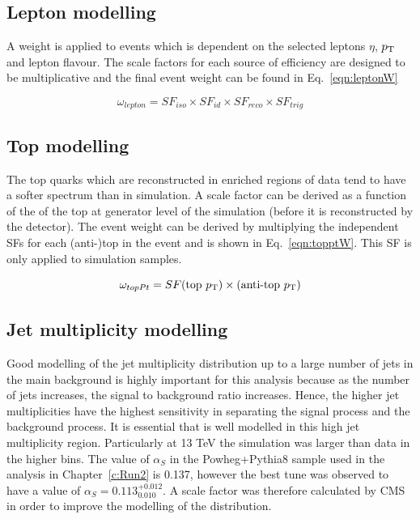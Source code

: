 \subsection{Lepton modelling}
A weight is applied to events which is dependent on the selected leptons $\eta$, $p_{\mathrm{T}}$ and lepton flavour. The scale factors for each source of efficiency are designed to be multiplicative and the final event weight can be found in Eq.~\ref{eqn:leptonW}

\begin{equation}
\omega_{lepton} = SF_{iso}\times SF_{id}\times SF_{reco}\times SF_{trig}
\label{eqn:leptonW}
\end{equation}

\subsection{Top \pt modelling}

The top quarks which are reconstructed in \ttbar enriched regions of data tend to have a softer \pt spectrum than in \ttbar simulation. A scale factor can be derived as a function of the \pt of the top at generator level of the simulation (before it is reconstructed by the detector). The event weight can be derived by multiplying the independent SFs for each (anti-)top in the event and is shown in Eq.~\ref{eqn:topptW}. This SF is only applied to \ttbar simulation samples.

\begin{equation}
\omega_{topPt} = SF(\textrm{top}~p_{\mathrm{T}})\times (\textrm{anti-top}~p_{\mathrm{T}})
\label{eqn:topptW}
\end{equation}

\subsection{Jet multiplicity modelling \label{subsec:alphaS}}
Good modelling of the jet multiplicity distribution up to a large number of jets in the main \ttbar background is highly important for this analysis because as the number of jets increases, the signal to background ratio increases. Hence, the higher jet multiplicities have the highest sensitivity in separating the signal \tttt process and the background \ttbar process. It is essential that \ttbar is well modelled in this high jet multiplicity region. 
Particularly at 13 TeV the simulation was larger than data in the higher \njets bins. The value of $\alpha_S$ in the \ttbar Powheg+Pythia8 sample used in the analysis in Chapter~\ref{c:Run2} is 0.137, however the best tune was observed to have a value of $\alpha_S=0.113^{+0.012}_{0.010}$. A scale factor was therefore calculated by CMS in order to improve the modelling of the \njets distribution. 

